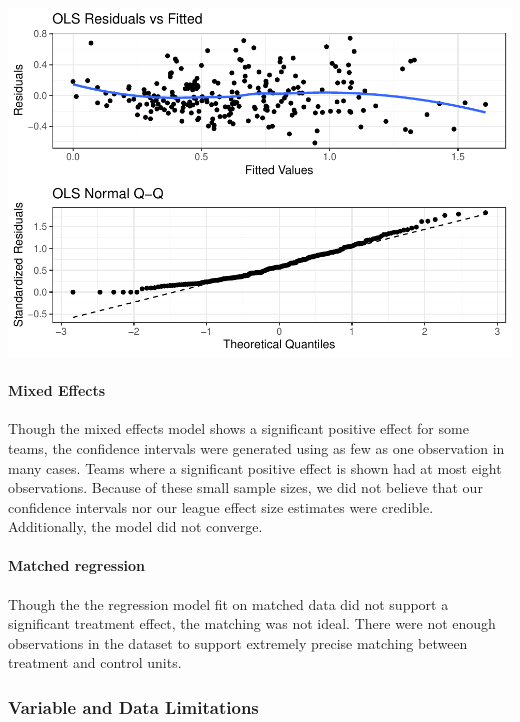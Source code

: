 \documentclass[12pt]{article}
\begin{document}
\includegraphics{journal-article-nb_files/figure-latex/ols-limitation-plots-1.pdf}

\hypertarget{mixed-effects}{%
\paragraph{Mixed Effects}\label{mixed-effects}}

Though the mixed effects model shows a significant positive effect for
some teams, the confidence intervals were generated using as few as one
observation in many cases. Teams where a significant positive effect is
shown had at most eight observations. Because of these small sample
sizes, we did not believe that our confidence intervals nor our league
effect size estimates were credible. Additionally, the model did not
converge.

\hypertarget{matched-regression}{%
\paragraph{Matched regression}\label{matched-regression}}

Though the the regression model fit on matched data did not support a
significant treatment effect, the matching was not ideal. There were not
enough observations in the dataset to support extremely precise matching
between treatment and control units.

\hypertarget{variable-and-data-limitations}{%
\subsubsection{Variable and Data
Limitations}\label{variable-and-data-limitations}}
\end{document}
